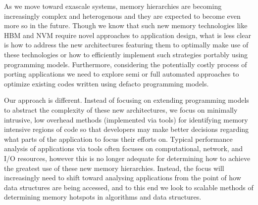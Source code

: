 As we move toward exascale systems, memory hierarchies are becoming increasingly complex and heterogenous and they are expected to become even more so in the future.
Though we know that such new memory technologies like \ac{HBM} and \ac{NVM} require novel approaches to application design, what is less clear is how to address the new architectures featuring them to optimally make use of these technologies or how to efficiently implement such strategies portably using programming models.
Furthermore, considering the potentially costly process of porting applications we need to explore semi or full automated approaches to optimize existing codes written using defacto programming models.

Our approach is different. Instead of focusing on extending programming models to abstract the 
complexity of these new architectures, we focus on  minimally intrusive, low overhead methods (implemented via tools) for identifying memory intensive regions of code so that developers may make better decisions regarding what parts of the application to focus their efforts on.
Typical performance analysis of applications via tools often focuses on computational, network, and I/O resources, however this is no longer adequate for determining how to achieve the greatest use of these new memory hierarchies.
Instead, the focus will increasingly need to shift toward analysing applications from the point of how data structures are being accessed, and to this end we look to scalable methods of determining memory hotspots in algorithms and data structures.

